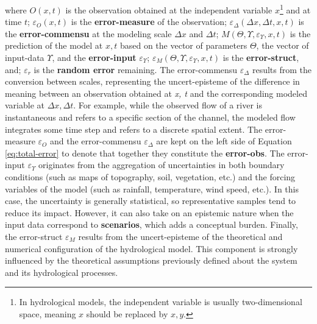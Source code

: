 \documentclass[./main_en.tex]{subfiles}
\begin{document}
where $O(x, t)$ is the observation obtained at the independent variable $x$\footnote{In hydrological models, the independent variable is usually two-dimensional space, meaning $x$ should be replaced by $x, y$.} and at time $t$; $\varepsilon_{O}(x, t)$ is the \textbf{\gls{error-measure}} of the observation; $\varepsilon_{\Delta}(\Delta x,\Delta t, x, t)$ is the \textbf{\gls{error-commensu}} at the modeling scale $\Delta x$ and $\Delta t$; $M(\Theta, \Upsilon, \varepsilon_{\Upsilon}, x, t)$ is the prediction of the \gls{model} at $x, t$ based on the vector of \gls{parameters} $\Theta$, the vector of \gls{input-data} $\Upsilon$, and the \textbf{\gls{error-input}} $\varepsilon_{\Upsilon}$; $\varepsilon_{M}(\Theta, \Upsilon, \varepsilon_{\Upsilon}, x, t)$ is the \textbf{\gls{error-struct}}, and; $\varepsilon_r$ is the \textbf{random error} remaining. The \gls{error-commensu} $\varepsilon_{\Delta}$ results from the conversion between scales, representing the \gls{uncert-episteme} of the difference in meaning between an observation obtained at \textit{x, t} and the corresponding modeled variable at $\Delta x, \Delta t$. For example, while the observed flow of a river is instantaneous and refers to a specific section of the channel, the modeled flow integrates some time step and refers to a discrete spatial extent. The \gls{error-measure} $\varepsilon_{O}$ and the \gls{error-commensu} $\varepsilon_{\Delta}$ are kept on the left side of Equation \eqref{eq:total-error} to denote that together they constitute the \textbf{\gls{error-obs}}. The \gls{error-input} $\varepsilon_\Upsilon$ originates from the aggregation of uncertainties in both boundary conditions (such as maps of topography, soil, vegetation, etc.) and the forcing variables of the \gls{model} (such as rainfall, temperature, wind speed, etc.). In this case, the uncertainty is generally statistical, so representative samples tend to reduce its impact. However, it can also take on an epistemic nature when the input data correspond to \textbf{scenarios}, which adds a conceptual burden. Finally, the \gls{error-struct} $\varepsilon_M$ results from the \gls{uncert-episteme} of the theoretical and numerical configuration of the hydrological \gls{model}. This component is strongly influenced by the theoretical assumptions previously defined about the \gls{system} and its hydrological processes.
\end{document}
